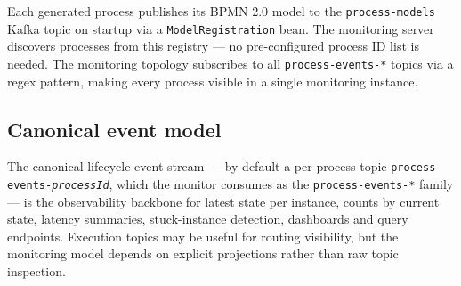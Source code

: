 Each generated process publishes its BPMN 2.0 model to the \texttt{process-models}
Kafka topic on startup via a \texttt{ModelRegistration} bean. The monitoring
server discovers processes from this registry — no pre-configured process ID
list is needed. The monitoring topology subscribes to all \texttt{process-events-*}
topics via a regex pattern, making every process visible in a single monitoring
instance.

\subsection{Canonical event model}

The canonical lifecycle-event stream --- by default a per-process topic
\texttt{process-events-\textit{processId}}, which the monitor consumes as the
\texttt{process-events-*} family --- is the observability backbone for
latest state per instance, counts by current state, latency summaries, stuck-instance
detection, dashboards and query endpoints. Execution topics may be useful for routing
visibility, but the monitoring model depends on explicit projections rather than raw topic
inspection.
